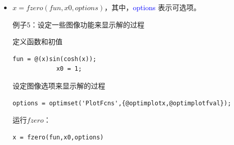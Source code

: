 \documentclass[10pt,math=newtx,citestyle=gb7714-2015,bibstyle=gb7714-2015]{elegantbook}
\begin{document}
{{{\begin{itemize}
		例子2：区间内的根——求解[0,1]上的余弦函数的根。
		
		\begin{lstlisting}[frame=shadowbox]
			fun = @cos; % 函数名
			x0 = [1 2]; % 初始区间
			x = fzero(fun,x0)
		\end{lstlisting}
		
		$x=1.5708$
		
		注意：$cos(1)$和$cos(2)$的符号不同。
		
		例子3：自定义函数求根
		
		求解函数$f(x)=x^3-2x-5$的根。
		
		首先，我们要写一个自定义函数的m文件，命名为f.m
		
		\begin{lstlisting}[frame=shadowbox]
			function y = f(x)
			y = x.^3-2*x-5;
		\end{lstlisting}
		
		将上述f.m文件保存到当前Matlab路径中。然后用$fzero$命令求解2 附近的根。
		
		\begin{lstlisting}[frame=shadowbox]
			fun = @f; % function
			x0 = 2; % initial point
			z = fzero(fun,x0)
		\end{lstlisting}
		
		$x=2.0946$
		
		例子4：带有参数的函数求根
		\begin{lstlisting}[frame=shadowbox]
			myfun = @(x,c) cos(c*x);  % parameterized function
			c = 2;                    % parameter
			fun = @(x) myfun(x,c);    % function of x alone
			x = fzero(fun,0.1)
		\end{lstlisting}
		
		$x=0.7854$
		
		\item $x=fzero(fun,x0,options)$，其中，\textcolor{blue}{options} 表示可选项。
		
		例子5：设定一些图像功能来显示解的过程
		
		定义函数和初值
		
		\begin{lstlisting}[frame=shadowbox]
			fun = @(x)sin(cosh(x));
			x0 = 1;
		\end{lstlisting}
		
		设定图像选项来显示解的过程
		\begin{lstlisting}[frame=shadowbox]
			options = optimset('PlotFcns',{@optimplotx,@optimplotfval});
		\end{lstlisting}
		
		运行$fzero$：
		\begin{lstlisting}[frame=shadowbox]
			x = fzero(fun,x0,options)
		\end{lstlisting}
		

\end{itemize}}}}
\end{document}
